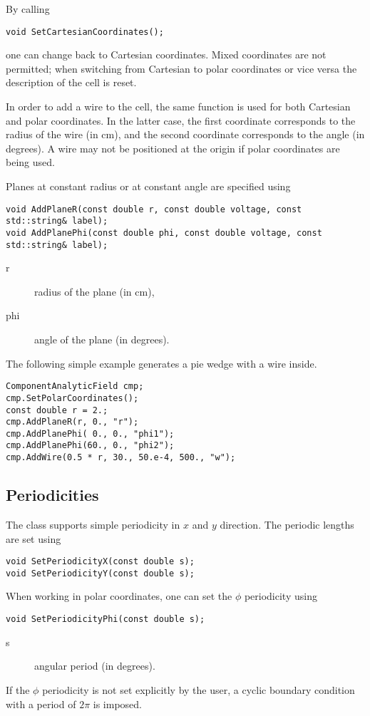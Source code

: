 By calling 
\begin{lstlisting}
void SetCartesianCoordinates();
\end{lstlisting} 
one can change back to Cartesian coordinates. 
Mixed coordinates are not permitted; when switching from Cartesian to polar 
coordinates or vice versa the description of the cell is reset.

In order to add a wire 
to the cell, the same function is used 
for both Cartesian and polar coordinates. In the latter case, the 
first coordinate corresponds to the radius of the wire (in cm), 
and the second coordinate corresponds to the angle (in degrees). 
A wire may not be positioned at the origin if polar coordinates are being used.

Planes at constant radius or at constant angle are specified using
\begin{lstlisting}
void AddPlaneR(const double r, const double voltage, const std::string& label);
void AddPlanePhi(const double phi, const double voltage, const std::string& label);
\end{lstlisting}
\begin{description}
  \item[r] radius of the plane (in cm),
  \item[phi] angle of the plane (in degrees).
\end{description}

The following simple example generates a pie wedge with a wire inside.
\begin{lstlisting}
ComponentAnalyticField cmp;
cmp.SetPolarCoordinates();
const double r = 2.;
cmp.AddPlaneR(r, 0., "r");
cmp.AddPlanePhi( 0., 0., "phi1");
cmp.AddPlanePhi(60., 0., "phi2");
cmp.AddWire(0.5 * r, 30., 50.e-4, 500., "w");
\end{lstlisting}

\subsection{Periodicities}
The class supports simple periodicity in \(x\) and \(y\) direction.
The periodic lengths are set using
\begin{lstlisting}
void SetPeriodicityX(const double s);
void SetPeriodicityY(const double s);
\end{lstlisting}

When working in polar coordinates, one can set the $\phi$ periodicity 
using
\begin{lstlisting}
void SetPeriodicityPhi(const double s);
\end{lstlisting} 
\begin{description}
  \item[s] angular period (in degrees).
\end{description}
If the $\phi$ periodicity is not set explicitly by the user, 
a cyclic boundary condition with a period of $2\pi$ is imposed.

